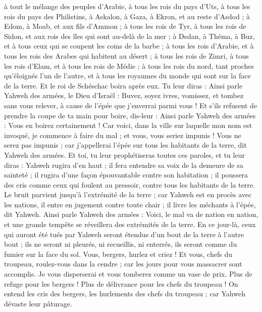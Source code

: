\begin{multicols}{2}
à tout le mélange des peuples d'Arabie, à tous les rois du pays d'Uts, à tous les rois du pays des Philistins, à Askalon, à Gaza, à Ekron, et au reste d'Asdod ;
à Edom, à Moab, et aux fils d'Ammon ;
à tous les rois de Tyr, à tous les rois de Sidon, et aux rois des îles qui sont au-delà de la mer ;
à Dedan, à Théma, à Buz, et à tous ceux qui se coupent les coins de la barbe ;
à tous les rois d'Arabie, et à tous les rois des Arabes qui habitent au désert ;
à tous les rois de Zimri, à tous les rois d'Elam, et à tous les rois de Médie ;
à tous les rois du nord, tant proches qu'éloignés l'un de l'autre, et à tous les royaumes du monde qui sont sur la face de la terre. Et le roi de Schéschac boira après eux.
Tu leur diras : Ainsi parle Yahweh des armées, le Dieu d'Israël : Buvez, soyez ivres, vomissez, et tombez sans vous relever, à cause de l'épée que j'enverrai parmi vous !
Et s'ils refusent de prendre la coupe de ta main pour boire, dis-leur : Ainsi parle Yahweh des armées : Vous en boirez certainement !
Car voici, dans la ville sur laquelle mon nom est invoqué, je commence à faire du mal ; et vous, vous seriez impunis ! Vous ne serez pas impunis ; car j'appellerai l'épée sur tous les habitants de la terre, dit Yahweh des armées.
Et toi, tu leur prophétiseras toutes ces paroles, et tu leur diras : Yahweh rugira d'en haut ; il fera entendre sa voix de la demeure de sa sainteté ; il rugira d'une façon épouvantable contre son habitation ; il poussera des cris comme ceux qui foulent au pressoir, contre tous les habitants de la terre.
Le bruit parvient jusqu'à l'extrémité de la terre ; car Yahweh est en procès avec les nations, il entre en jugement contre toute chair ; il livre les méchants à l'épée, dit Yahweh.
Ainsi parle Yahweh des armées : Voici, le mal va de nation en nation, et une grande tempête se réveillera des extrémités de la terre.
En ce jour-là, ceux qui auront été tués par Yahweh seront étendus d'un bout de la terre à l'autre bout ; ils ne seront ni pleurés, ni recueillis, ni enterrés, ils seront comme du fumier sur la face du sol.
Vous, bergers, hurlez et criez ! Et vous, chefs du troupeau, roulez-vous dans la cendre ; car les jours pour vous massacrer sont accomplis. Je vous disperserai et vous tomberez comme un vase de prix.
Plus de refuge pour les bergers ! Plus de délivrance pour les chefs du troupeau !
On entend les cris des bergers, les hurlements des chefs du troupeau ; car Yahweh dévaste leur pâturage.

\end{multicols}
